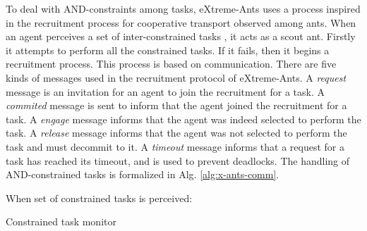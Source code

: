 To deal with AND-constraints among tasks, eXtreme-Ants uses a process inspired in the recruitment process for cooperative transport observed among ants. When an agent perceives a set of inter-constrained tasks \andtasks{}, it acts as a scout ant. Firstly it attempts to perform all the constrained tasks. If it fails, then it begins a recruitment process. This process is based on communication. There are five kinds of messages used in the recruitment protocol of eXtreme-Ants. A \textit{request} message is an invitation for an agent to join the recruitment for a task. A \textit{commited} message is sent to inform  that the agent joined the recruitment for a task. A \textit{engage} message informs that the agent was indeed selected to perform the task. A \textit{release} message informs that the agent was not selected to perform the task and must decommit to it. A \textit{timeout} message informs that a request for a task has reached its timeout, and is used to prevent deadlocks. The handling of AND-constrained tasks is formalized in Alg. \ref{alg:x-ants-comm}.


\begin{algorithm}[ht]
\begin{algorithmic}
\STATE When set of constrained tasks \andtasks{} is perceived:
\STATE{$\beta \gets \emptyset$}
		\ENDIF
	    \ENDIF
    \ENDFOR 
\ENDIF
{}
\end{algorithmic}
\caption{Constrained task monitor}
\label{alg:x-ants-comm}
\end{algorithm}


